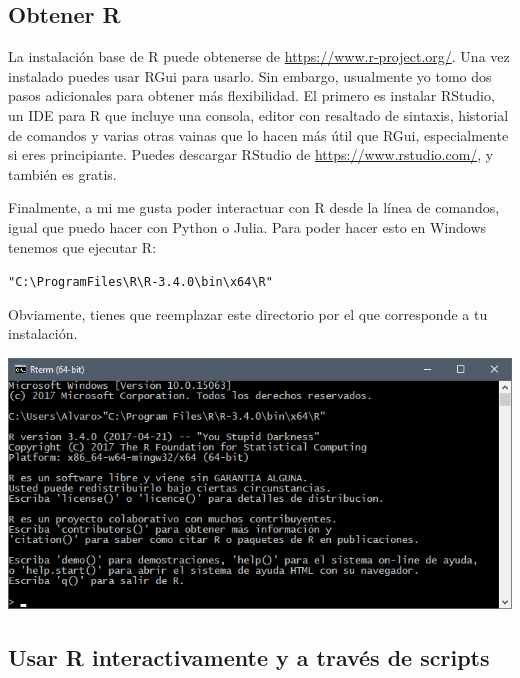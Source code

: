 \documentclass{report}\usepackage[]{graphicx}\usepackage[]{color}
\makeatletter
\newcommand{\hlstr}[1]{\textcolor[rgb]{0.192,0.494,0.8}{#1}}%
\newenvironment{kframe}{%
 \def\at@end@of@kframe{}%
 \ifinner\ifhmode%
  \def\at@end@of@kframe{\end{minipage}}%
  \begin{minipage}{\columnwidth}%
 \fi\fi%
 \def\FrameCommand##1{\hskip\@totalleftmargin \hskip-\fboxsep
 \colorbox{shadecolor}{##1}\hskip-\fboxsep
     \hskip-\linewidth \hskip-\@totalleftmargin \hskip\columnwidth}%
 \MakeFramed {\advance\hsize-\width
   \@totalleftmargin\z@ \linewidth\hsize
   \@setminipage}}%
 {\par\unskip\endMakeFramed%
 \at@end@of@kframe}
\newenvironment{knitrout}{}{} %
\makeatother
\begin{document}
\subsection{Obtener R}

La instalación base de R puede obtenerse de \url{https://www.r-project.org/}. Una vez instalado puedes usar RGui para usarlo. Sin embargo, usualmente yo tomo dos pasos adicionales para obtener más flexibilidad. El primero es instalar RStudio, un IDE para R que incluye una consola, editor con resaltado de sintaxis, historial de comandos y varias otras vainas que lo hacen más útil que RGui, especialmente si eres principiante. Puedes descargar RStudio de \url{https://www.rstudio.com/}, y también es gratis.

Finalmente, a mi me gusta poder interactuar con R desde la línea de comandos, igual que puedo hacer con Python o Julia. Para poder hacer esto en Windows tenemos que ejecutar R:

\begin{knitrout}
\color{fgcolor}\begin{kframe}
\begin{alltt}
\hlstr{"C:\textbackslash{}Program Files\textbackslash{}R\textbackslash{}R-3.4.0\textbackslash{}bin\textbackslash{}x64\textbackslash{}R"}
\end{alltt}
\end{kframe}
\end{knitrout}

Obviamente, tienes que reemplazar este directorio por el que corresponde a tu instalación. 

\includegraphics[width=\linewidth]{sss/r-win-command-prompt}

\subsection{Usar R interactivamente y a través de scripts}
\end{document}
